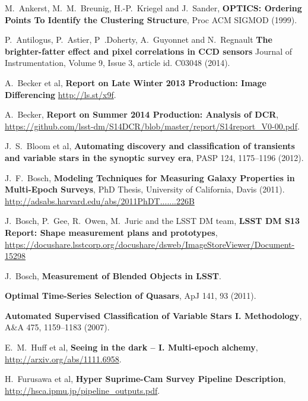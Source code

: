 \documentclass[12pt]{article}
\begin{document}
\clearpage

\begin{thebibliography}{10}

 M.~Ankerst, M.~M.~Breunig, H.-P.~Kriegel and J.~Sander,
  \textbf{OPTICS: Ordering Points To Identify the Clustering Structure},
  Proc ACM SIGMOD (1999).

 P.~Antilogus, P.~Astier, P~.Doherty, A.~Guyonnet and N.~Regnault
  \textbf{The brighter-fatter effect and pixel correlations in CCD sensors}
  Journal of Instrumentation, Volume 9, Issue 3, article id. C03048 (2014).

 A.~Becker et al,
  \textbf{Report on Late Winter 2013 Production: Image Differencing}
  \url{http://ls.st/x9f}.

 A.~Becker,
  \textbf{Report on Summer 2014 Production: Analysis of DCR},
  \url{https://github.com/lsst-dm/S14DCR/blob/master/report/S14report_V0-00.pdf}.

 J.~S.~Bloom et al,
  \textbf{Automating discovery and classification of transients and variable stars in the synoptic survey era},
  PASP 124, 1175--1196 (2012).

 J.~F.~Bosch,
  \textbf{Modeling Techniques for Measuring Galaxy Properties in Multi-Epoch Surveys},
  PhD Thesis, University of California, Davis (2011). \url{http://adsabs.harvard.edu/abs/2011PhDT.......226B}

 J.~Bosch, P.~Gee, R.~Owen, M.~Juric and the LSST DM team,
  \textbf{LSST DM S13 Report: Shape measurement plans and prototypes},
  \url{https://docushare.lsstcorp.org/docushare/dsweb/ImageStoreViewer/Document-15298}

 J.~Bosch,
  \textbf{Measurement of Blended Objects in LSST}.

  \textbf{Optimal Time-Series Selection of Quasars},
  ApJ 141, 93 (2011).

  \textbf{Automated Supervised Classification of Variable Stars I. Methodology},
  A\&A 475, 1159–1183 (2007).

 E.~M.~Huff et al,
  \textbf{Seeing in the dark -- I. Multi-epoch alchemy},
  \url{http://arxiv.org/abs/1111.6958}.

 H.~Furusawa et al,
  \textbf{Hyper Suprime-Cam Survey Pipeline Description},
  \url{http://hsca.ipmu.jp/pipeline_outputs.pdf}.


\end{thebibliography}
\end{document}
